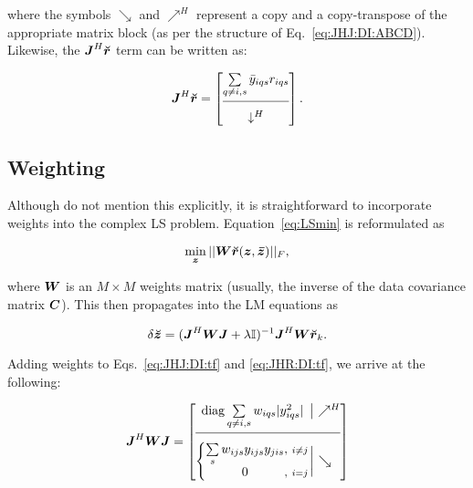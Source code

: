 \documentclass[useAMS,usenatbib]{mn2e}
\newcommand{\II}{\mathbb{I}}
\newcommand{\mat}[1]{{\bmath{#1}}}
\newcommand{\JJ}{\mat{J}} %
\begin{document}
where the symbols $\searrow$ and $\nearrow^H$ represent a copy and a copy-transpose of the appropriate matrix block (as per the structure of Eq.~\ref{eq:JHJ:DI:ABCD}). Likewise, the $\JJ^H\Rr$ term can be written as:

\begin{equation}
\label{eq:JHR:DI:tf}
\JJ^H\Rr 
= \Matrix{c}{
\sum\limits_{q\ne i,s} \bar{y}_{iqs} r_{iqs}   \\
 \hline \\[-8pt]
\downarrow^H
}.
\end{equation}

\subsection{Weighting}
\label{sec:DI:W}

Although \citet{ComplexOpt} do not mention this explicitly, it is straightforward to incorporate weights into the 
complex LS problem. Equation~\ref{eq:LSmin} is reformulated as

\begin{equation}
\label{eq:LSmin:w}
\min_{\bmath{z}} ||\mat{W} \Rr(\bmath{z},\bmath{\bar z})||_F,
\end{equation}

where $\mat{W}$ is an $M\times M$ weights matrix (usually, the inverse of the data covariance matrix $\mat{C}$). This then propagates into the LM equations as

\begin{equation}
\label{eq:LM:W}
\delta\Zz = (\JJ^H \mat{W} \JJ + \lambda\II)^{-1}\JJ^H \mat{W} \Rr_k.
\end{equation}

Adding weights to Eqs.~\ref{eq:JHJ:DI:tf} and \ref{eq:JHR:DI:tf}, we arrive at the following:


\begin{equation}
\label{eq:JHJ:DI:tfw}
\JJ^H\mat{W}\JJ = 
\JHJblocks{
  \mathrm{diag} \sum\limits_{q\ne i,s} w_{iqs} |y^2_{iqs}|
}{
  \left \{ 
  \begin{array}{@{}c@{,~}c@{}}
   \sum\limits_{s} w_{ijs} y_{ijs}y_{jis}&{\scriptstyle i\ne j} \\
   0 &{\scriptstyle i=j}
  \end{array} \right . 
}
\end{equation}
\end{document}
